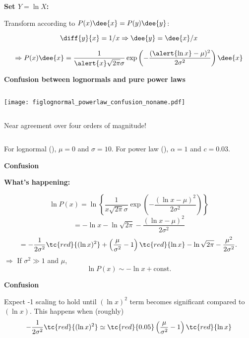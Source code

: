   

  \textbf{Set $Y = \ln X$:}
    
     Transform according to $P(x) \dee{x} = P(y) \dee{y}$:
    
      $$
      \diff{y}{x} = 1/x \Rightarrow \dee{y} = \dee{x} / x
      $$
    
      $$
      \Rightarrow P(x) \dee{x} 
      = \frac{1}{\alert{x} \sqrt{2\pi} \sigma} 
      \exp 
      \left(
        -\frac{(\alert{\ln x}-\mu)^2}
        {2\sigma^2}
      \right)
      \dee{x}
      $$
    
  


  \textbf{Confusion between lognormals and pure power laws}

      \begin{column}{0.6\textwidth}
      \texttt{[image: figlognormal\_powerlaw\_confusion\_noname.pdf]}    
    \end{column}
    \begin{column}{0.3\textwidth}
      Near agreement over four orders of magnitude!
    \end{column}
  
  
   For lognormal (), $\mu=0$ and $\sigma=10$.
   For power law (), $\alpha=1$ and $c=0.03$.
  


  \textbf{Confusion}

  \textbf{What's happening:}
    
       $$
      \ln P(x) = 
      \ln 
      \left\{ 
        \frac{1}{x \sqrt{2\pi} \sigma}
        \exp 
        \left(
          -\frac{(\ln x-\mu)^2}
          {2\sigma^2}
        \right)
      \right\}
      $$
        $$
      = -\ln x  
      -\ln \sqrt{2\pi}
      -\frac{(\ln x-\mu)^2}
      {2\sigma^2}
      $$
       $$
      = 
      -\frac{1}
      {2\sigma^2}
      \tc{red}{  (\ln x)^2}
      + \left(
        \frac{\mu}{\sigma^2} - 1
      \right)
      \tc{red}{\ln x  }
      -\ln \sqrt{2\pi}
      -\frac{\mu^2}
      {2\sigma^2}.
      $$
     $\Rightarrow$ If $\sigma^2 \gg 1$ and $\mu$,
     $$
      \boxed{\ln P(x) \sim - \ln {x} + \mbox{const.} }
      $$

    
  


  \textbf{Confusion}

  
     Expect -1 scaling to hold until $(\ln{x})^2$ term 
    becomes significant compared to $(\ln{x})$.
     This happens when (roughly)
   $$
    -\frac{1}
    {2\sigma^2}
    \tc{red}{  (\ln x)^2}
    \simeq
    \tc{red}{0.05}
    \left(
      \frac{\mu}{\sigma^2} - 1
    \right)
    \tc{red}{\ln x  }
    $$
  
